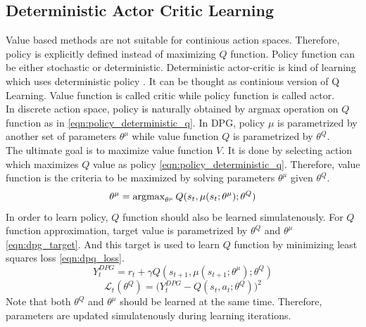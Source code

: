 \subsection{Deterministic Actor Critic Learning}
Value based methods are not suitable for continious action spaces. Therefore, policy is explicitly defined instead of maximizing $Q$ function. Policy function can be either stochastic or deterministic.  Deterministic actor-critic is kind of learning which uses deterministic policy \cite{silver_deterministic_2014}. It can be thought as continious version of Q Learning. Value function is called critic while policy function is called actor. \\
In discrete action space, policy is naturally obtained by argmax operation on $Q$ function as in \ref{eqn:policy_deterministic_q}. In DPG, policy $\mu$ is parametrized by another set of parameters $\theta^\mu$ while value function $Q$ is parametrized by $\theta^Q$. \\
The ultimate goal is to maximize value function $V$. It is done by selecting action which maximizes $Q$ value as policy \eqref{eqn:policy_deterministic_q}. Therefore, value function is the criteria to be maximized by solving parameters $\theta^\mu$ given $\theta^Q$. 
\begin{equation}
\label{eqn:dpg_value_maximization}
\theta^\mu = \operatorname{\textup{argmax}}_{\theta^\mu} Q(s_t, \mu(s_t;\theta^\mu);\theta^Q)
\end{equation}
In order to learn policy, $Q$ function should also be learned simulatenously. For $Q$ function approximation, target value is parametrized by $\theta^Q$ and $\theta^\mu$ \eqref{eqn:dpg_target}. And this target is used to learn $Q$ function by minimizing least squares loss \eqref{eqn:dpq_loss}. \\
\begin{equation}
\label{eqn:dpg_target}
Y_t^{DPG} = r_t + \gamma Q(s_{t+1}, \mu(s_{t+1};\theta^\mu);\theta^Q)
\end{equation}
\begin{equation}
\label{eqn:dpq_loss}
\mathcal{L}_t(\theta^Q) = \big( Y_t^{DPG} - Q(s_t,a_t;\theta^Q) \big) ^ 2
\end{equation}
Note that both $\theta^Q$ and $\theta^\mu$ should be learned at the same time. Therefore, parameters are updated simulatenously during learning iterations. \\
